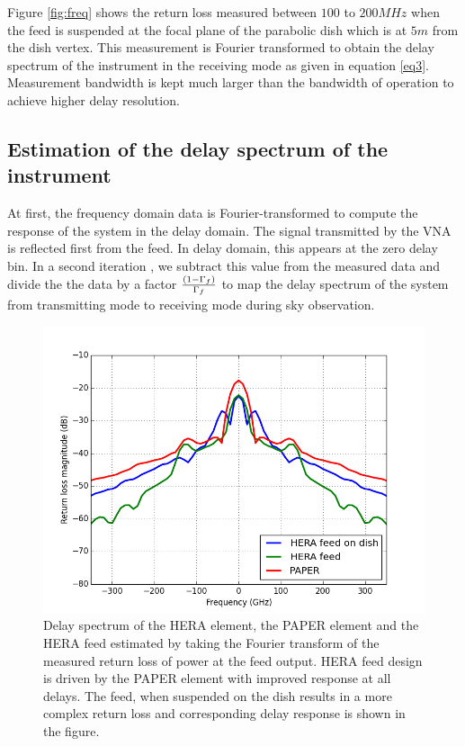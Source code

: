 \documentclass[twocolumn]{emulateapj}
\begin{document}
Figure \ref{fig:freq} shows the return loss measured between $100$ to
$200MHz$ when the feed is suspended at the focal plane of the parabolic dish which is at $5m$ from the dish vertex. This measurement is Fourier transformed to obtain the delay spectrum of the instrument in the receiving mode as given in equation \ref{eq3}. Measurement bandwidth is kept much larger than the bandwidth of operation to achieve higher delay resolution.

\subsection{Estimation of the delay spectrum of the instrument}
At first, the frequency domain data is Fourier-transformed to compute the response of the system in the delay domain. The signal transmitted by the VNA is reflected first from the feed. In delay domain, this appears at the zero delay bin. In a second iteration , we subtract this value from the measured data and divide the the data by a factor ${(1-\Gamma_{f})\over \Gamma_{f}}$ to map the delay spectrum of the system from transmitting mode to receiving mode during sky observation.  

\begin{figure}
\centering
\includegraphics[width=\linewidth]{plots/delay_spectrum_100_200_BH.png}
\caption{Delay spectrum of the HERA element, the PAPER element and the HERA feed estimated by taking the Fourier transform of the measured return loss of power at the feed output. HERA feed design is driven by the PAPER element with improved response at all delays. The feed, when suspended on the dish results in a more complex return loss and corresponding delay response is shown in the figure.}
\label{fig:delay_spectrum}
\end{figure}
\end{document}
